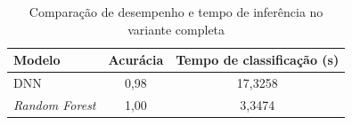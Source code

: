 \begin{table}[H]
  \centering
  \small
  \begin{tabular}{lcc}
    \hline
    \textbf{Modelo} & \textbf{Acurácia} & \textbf{Tempo de classificação (s)} \\ \hline
    DNN             & 0,98              & 17,3258                             \\
    \textit{Random Forest}   & 1,00              & 3,3474                              \\ \hline
  \end{tabular}
  \caption{Comparação de desempenho e tempo de inferência no variante completa}
  \label{tab:total_completo_tempo_de_classificacao}
\end{table}